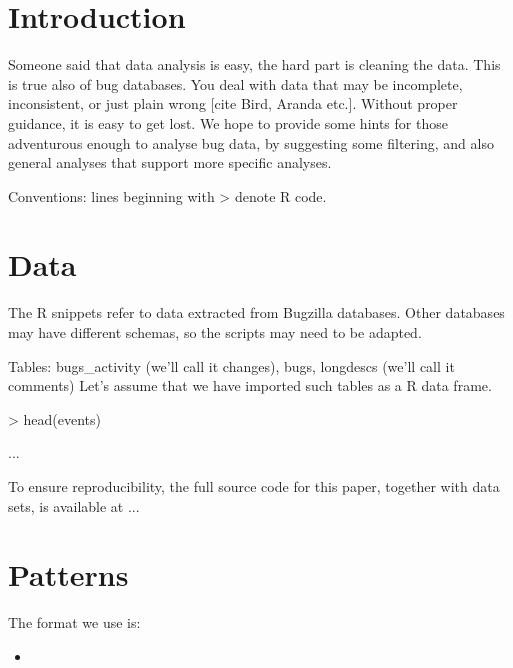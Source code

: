 \section{Introduction}

Someone said that data analysis is easy, the hard part is cleaning the data. This is true also of bug databases. You deal with data that may be incomplete, inconsistent, or just plain wrong [cite Bird, Aranda etc.]. Without proper guidance, it is easy to get lost. We hope to provide some hints for those adventurous enough to analyse bug data, by suggesting some filtering, and also general analyses that support more specific analyses.

Conventions: lines beginning with > denote R code.

\section{Data}

The R snippets refer to data extracted from Bugzilla databases. Other databases may have different schemas, so the scripts may need to be adapted.

Tables: bugs\_activity (we'll call it changes), bugs, longdescs (we'll call it comments)
Let's assume that we have imported such tables as a R data frame.

> head(events)

...

To ensure reproducibility, the full source code for this paper, together with data sets, is available at ...

\section{Patterns}

The format we use is:

\begin{itemize}
  \item  
\end{itemize}


